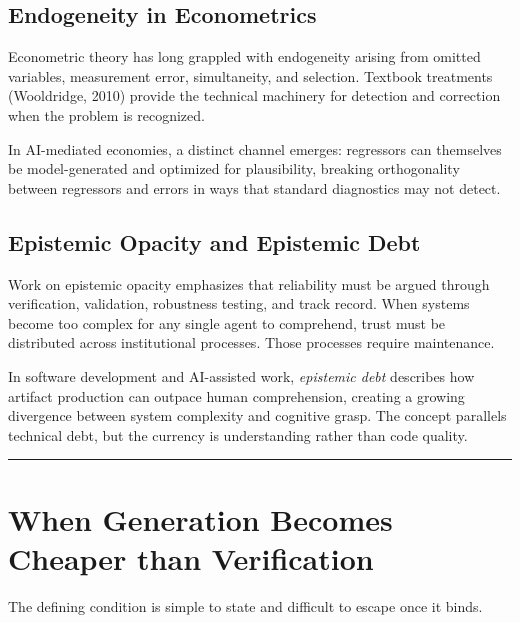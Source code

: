 \documentclass[11pt,a4paper]{article}
\begin{document}
\hypertarget{endogeneity-in-econometrics}{%
\subsection{ Endogeneity in Econometrics}\label{endogeneity-in-econometrics}}

Econometric theory has long grappled with endogeneity arising from omitted variables, measurement error, simultaneity, and selection. Textbook treatments (Wooldridge, 2010) provide the technical machinery for detection and correction when the problem is recognized.

In AI-mediated economies, a distinct channel emerges: regressors can themselves be model-generated and optimized for plausibility, breaking orthogonality between regressors and errors in ways that standard diagnostics may not detect.

\hypertarget{epistemic-opacity-and-epistemic-debt}{%
\subsection{ Epistemic Opacity and Epistemic Debt}\label{epistemic-opacity-and-epistemic-debt}}

Work on epistemic opacity emphasizes that reliability must be argued through verification, validation, robustness testing, and track record. When systems become too complex for any single agent to comprehend, trust must be distributed across institutional processes. Those processes require maintenance.

In software development and AI-assisted work, \emph{epistemic debt} describes how artifact production can outpace human comprehension, creating a growing divergence between system complexity and cognitive grasp. The concept parallels technical debt, but the currency is understanding rather than code quality.

\begin{center}\rule{0.5\linewidth}{0.5pt}\end{center}

\hypertarget{when-generation-becomes-cheaper-than-verification}{%
\section{When Generation Becomes Cheaper than Verification}\label{when-generation-becomes-cheaper-than-verification}}

The defining condition is simple to state and difficult to escape once it binds.
\end{document}
